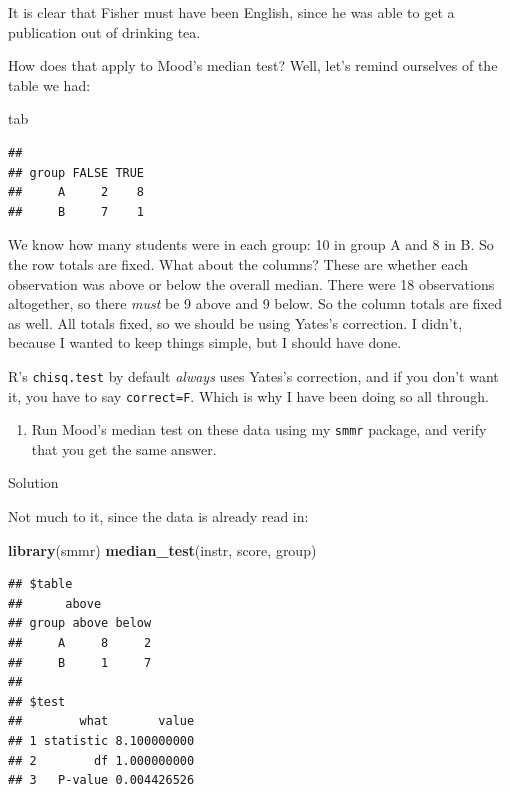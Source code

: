 \documentclass[]{tufte-book}
\newenvironment{Shaded}{}{}
\newcommand{\KeywordTok}[1]{\textcolor[rgb]{0.00,0.44,0.13}{\textbf{#1}}}
\newcommand{\NormalTok}[1]{#1}
\providecommand{\tightlist}{%
  \setlength{\itemsep}{0pt}\setlength{\parskip}{0pt}}
\theoremstyle{definition}
\theoremstyle{definition}
\theoremstyle{definition}
\theoremstyle{remark}
\begin{document}
It is clear that Fisher must have been English, since he was able to get
a publication out of drinking tea.

How does that apply to Mood's median test? Well, let's remind ourselves
of the table we had:

\begin{Shaded}
\begin{Highlighting}[]
\NormalTok{tab}
\end{Highlighting}
\end{Shaded}

\begin{verbatim}
##      
## group FALSE TRUE
##     A     2    8
##     B     7    1
\end{verbatim}

We know how many students were in each group: 10 in group A and 8 in B.
So the row totals are fixed. What about the columns? These are whether
each observation was above or below the overall median. There were 18
observations altogether, so there \emph{must} be 9 above and 9 below.
So the column totals are fixed as well. All totals fixed, so we should
be using Yates's correction. I didn't, because I wanted to keep things
simple, but I should have done.

R's \texttt{chisq.test} by default \emph{always} uses Yates's
correction, and if you don't want it, you have to say
\texttt{correct=F}. Which is why I have been doing so all through.

\begin{enumerate}
\def\labelenumi{(\alph{enumi})}
\setcounter{enumi}{4}
\tightlist
\item
  Run Mood's median test on these data using my \texttt{smmr} package,
  and verify that you get the same answer.
\end{enumerate}

Solution

Not much to it, since the data is already read in:

\begin{Shaded}
\begin{Highlighting}[]
\KeywordTok{library}\NormalTok{(smmr)}
\KeywordTok{median_test}\NormalTok{(instr, score, group)}
\end{Highlighting}
\end{Shaded}

\begin{verbatim}
## $table
##      above
## group above below
##     A     8     2
##     B     1     7
## 
## $test
##        what       value
## 1 statistic 8.100000000
## 2        df 1.000000000
## 3   P-value 0.004426526
\end{verbatim}
\end{document}
